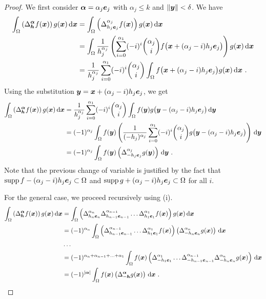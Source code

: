 \begin{proof}
 We first consider ${\bm{\alpha}} = \alpha_j {\bm{e}}_j$ with
$\alpha_j \leq k$ and $\|{\bm{y}}\|< \delta$.  We have
\begin{align*}
\int_{\Omega} \left(\Delta^{{\bm{\alpha}}}_{{\bm{h}}} f ({\bm{x}})\right)
g({\bm{x}}) \,\mathrm{d}{{\bm{x}}}
&= \int_{\Omega} \left(\Delta^{\alpha_j}_{h_j {\bm{e}}_j} f({\bm{x}})\right)
g({\bm{x}}) \,\mathrm{d}{{\bm{x}}} \\
&= \int_{\Omega} \frac{1}{h_j^{\alpha_j}}
\left( \sum_{i=0}^{\alpha_1} (-i)^i \binom{\alpha_j}{i}
f\big({\bm{x}} + (\alpha_j-i) h_j {\bm{e}}_j\big) \right)
g({\bm{x}})\,\mathrm{d}{{\bm{x}}} \\
&= \frac{1}{h_j^{\alpha_j}} \sum_{i=0}^{\alpha_1} (-i)^i \binom{\alpha_j}{i}
\int_{\Omega} f\big({\bm{x}} + (\alpha_j-i) h_j {\bm{e}}_j\big)
g({\bm{x}})\,\mathrm{d}{{\bm{x}}} \ .
\end{align*}
Using the substitution ${\bm{y}} = {\bm{x}} + (\alpha_j-i)h_j{\bm{e}}_j$,
we get
\begin{align*}
\int_{\Omega} \left(\Delta^{{\bm{\alpha}}}_{{\bm{h}}} f ({\bm{x}})\right)
g({\bm{x}}) \,\mathrm{d}{{\bm{x}}}
&= \frac{1}{h_j^{\alpha_j}} \sum_{i=0}^{\alpha_1} (-i)^i \binom{\alpha_j}{i}
\int_{\Omega} f({\bm{y}}) g\big({\bm{y}} - (\alpha_j-i) h_j {\bm{e}}_j\big)
\,\mathrm{d}{{\bm{y}}} \\
&= (-1)^{\alpha_j} \int_{\Omega} f({\bm{y}}) \left( \frac{1}{(-h_j)^{\alpha_j}}
\sum_{i=0}^{\alpha_1} (-i)^i \binom{\alpha_j}{i}
g\big({\bm{y}} - (\alpha_j-i) h_j {\bm{e}}_j\big) \right) \,\mathrm{d}{{\bm{y}}} \\
&= (-1)^{\alpha_j} \int_{\Omega} f({\bm{y}})
\left(\Delta^{\alpha_j}_{-h_j {\bm{e}}_j} g
({\bm{y}})\right)  \,\mathrm{d}{{\bm{y}}} \ .
\end{align*}
Note that the previous change of variable is justified by the fact that
$\operatorname{supp} f - (\alpha_j -i)h_j{\bm{e}}_j \subset \Omega$
and
$\operatorname{supp} g + (\alpha_j -i)h_j{\bm{e}}_j \subset \Omega$
for all $i$.

 For the general case, we proceed recursively using (i).
\begin{align*}
\int_{\Omega} \left(\Delta^{\VEC{\alpha}}_{\VEC{h}} f (\VEC{x})\right) g(\VEC{x})
\dx{\VEC{x}}
&= \int_{\Omega} \left(
\Delta_{h_n\VEC{e}_n}^{\alpha_n} \Delta_{h_{n-1}\VEC{e}_{n-1}}^{\alpha_{n-1}} \ldots
\Delta_{h_1\VEC{e}_1}^{\alpha_1} f (\VEC{x})\right) g(\VEC{x}) \dx{\VEC{x}} \\
&= (-1)^{\alpha_n} \int_{\Omega} \left(
\Delta_{h_{n-1}\VEC{e}_{n-1}}^{\alpha_{n-1}} \ldots
\Delta_{h_1\VEC{e}_1}^{\alpha_1} f (\VEC{x})\right)
\left( \Delta_{-h_n\VEC{e}_n}^{\alpha_n}  g(\VEC{x}) \right) \dx{\VEC{x}} \\
& \ldots \\
&= (-1)^{\alpha_n + \alpha_{n-1} + \ldots + \alpha_1}
\int_{\Omega} f(\VEC{x}) \left( \Delta_{-h_1\VEC{e}_1}^{\alpha_1} \ldots
\Delta_{-h_{n-1}\VEC{e}_{n-1}}^{\alpha_{n-1}} \Delta_{-h_n\VEC{e}_n}^{\alpha_n}
g(\VEC{x})\right) \dx{\VEC{x}} \\
&= (-1)^{|\VEC{\alpha}|} \int_{\Omega} f(\VEC{x})
\left(\Delta^{\VEC{\alpha}}_{-\VEC{h}} g (\VEC{x})\right) \dx{\VEC{x}} \ .
\qedhere
\end{align*}
\end{proof}

